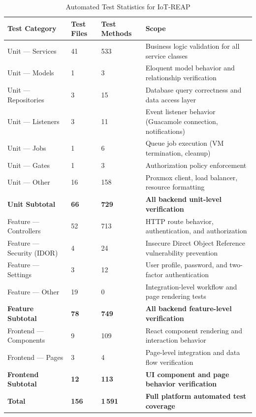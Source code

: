\begin{table}[H]
\centering
\caption{Automated Test Statistics for IoT-REAP}
\label{tab:test-statistics}
\begin{tabular}{|p{4cm}|p{3cm}|p{3cm}|p{4.5cm}|}
\hline
\textbf{Test Category} & \textbf{Test Files} & \textbf{Test Methods} & \textbf{Scope} \\
\hline
Unit --- Services & 41 & 533 & Business logic validation for all service classes \\
\hline
Unit --- Models & 1 & 3 & Eloquent model behavior and relationship verification \\
\hline
Unit --- Repositories & 3 & 15 & Database query correctness and data access layer \\
\hline
Unit --- Listeners & 3 & 11 & Event listener behavior (Guacamole connection, notifications) \\
\hline
Unit --- Jobs & 1 & 6 & Queue job execution (VM termination, cleanup) \\
\hline
Unit --- Gates & 1 & 3 & Authorization policy enforcement \\
\hline
Unit --- Other & 16 & 158 & Proxmox client, load balancer, resource formatting \\
\hline
\textbf{Unit Subtotal} & \textbf{66} & \textbf{729} & \textbf{All backend unit-level verification} \\
\hline
Feature --- Controllers & 52 & 713 & HTTP route behavior, authentication, and authorization \\
\hline
Feature --- Security (IDOR) & 4 & 24 & Insecure Direct Object Reference vulnerability prevention \\
\hline
Feature --- Settings & 3 & 12 & User profile, password, and two-factor authentication \\
\hline
Feature --- Other & 19 & 0 & Integration-level workflow and page rendering tests \\
\hline
\textbf{Feature Subtotal} & \textbf{78} & \textbf{749} & \textbf{All backend feature-level verification} \\
\hline
Frontend --- Components & 9 & 109 & React component rendering and interaction behavior \\
\hline
Frontend --- Pages & 3 & 4 & Page-level integration and data flow verification \\
\hline
\textbf{Frontend Subtotal} & \textbf{12} & \textbf{113} & \textbf{UI component and page behavior verification} \\
\hline
\textbf{Total} & \textbf{156} & \textbf{1\,591} & \textbf{Full platform automated test coverage} \\
\hline
\end{tabular}
\end{table}

